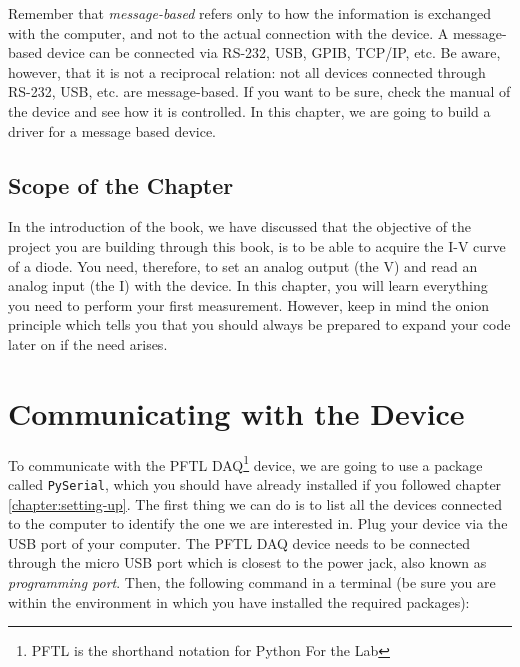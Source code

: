 
Remember that \textit{message-based} refers only to how the information is exchanged with the computer, and not to the actual connection with the device. A message-based device can be connected via RS-232, USB, GPIB, TCP/IP, etc. Be aware, however, that it is not a reciprocal relation: not all devices connected through RS-232, USB, etc. are message-based. If you want to be sure, check the manual of the device and see how it is controlled. In this chapter, we are going to build a driver for a message based device.

\subsection{Scope of the Chapter}
In the introduction of the book, we have discussed that the objective of the project you are building through this book, is to be able to acquire the I-V curve of a diode. You need, therefore, to set an analog output (the V) and read an analog input (the I) with the device. In this chapter, you
will learn everything you need to perform your first measurement. However, keep in mind the onion principle which tells you that you should always be prepared to expand your code later on if the need arises.

\section{Communicating with the Device}\label{message-basedevices}
To communicate with the {PFTL DAQ}\footnote{PFTL is the shorthand notation for Python For the Lab} device, we are going to use a package called \texttt{PySerial}, which you should have already installed if you followed chapter \ref{chapter:setting-up}. The first thing we can do is to list all the devices connected to the computer to identify the one we are interested in. Plug your device via the USB port of your computer. The {PFTL DAQ} device needs to be connected through the micro USB port which is closest to the power jack, also known as \emph{programming port}. Then, the following command in a terminal (be sure you are within the environment in which you have installed the required packages):

